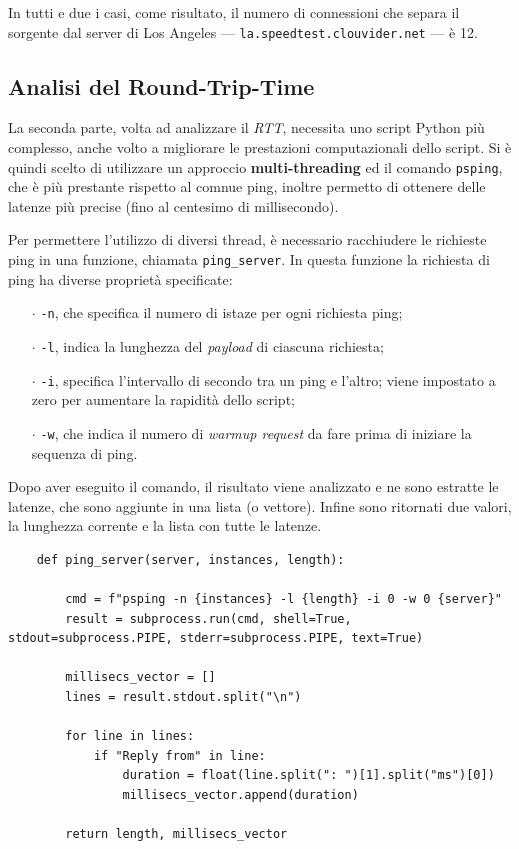\noindent In tutti e due i casi, come risultato, il numero di connessioni che separa il sorgente dal server di Los Angeles — \texttt{la.speedtest.clouvider.net} — è 12.


\vspace{20px}\subsection{Analisi del Round-Trip-Time}\label{RTT}

La seconda parte, volta ad analizzare il \textsl{RTT}, necessita uno script Python più complesso, anche volto a migliorare le prestazioni computazionali dello script. Si è quindi scelto di utilizzare un approccio \textbf{multi-threading} ed il comando \texttt{psping}, che è più prestante rispetto al comnue ping, inoltre permetto di ottenere delle latenze più precise (fino al centesimo di millisecondo).

Per permettere l'utilizzo di diversi thread, è necessario racchiudere le richieste ping in una funzione, chiamata \texttt{ping\_server}. In questa funzione la richiesta di ping ha diverse proprietà specificate:
\vspace{-3px}
\begin{itemize}
    \setlength{\itemsep}{-2px}
    \item[$\cdot$] \texttt{-n}, che specifica il numero di istaze per ogni richiesta ping;
    \item[$\cdot$] \texttt{-l}, indica la lunghezza del \textsl{payload} di ciascuna richiesta;
    \item[$\cdot$] \texttt{-i}, specifica l'intervallo di secondo tra un ping e l'altro; viene impostato a zero per aumentare la rapidità dello script;
    \item[$\cdot$] \texttt{-w}, che indica il numero di \textsl{warmup request} da fare prima di iniziare la sequenza di ping.
\end{itemize}
\noindent Dopo aver eseguito il comando, il risultato viene analizzato e ne sono estratte le latenze, che sono aggiunte in una lista (o vettore). Infine sono ritornati due valori, la lunghezza corrente e la lista con tutte le latenze.

\begin{lstlisting}
    def ping_server(server, instances, length):

        cmd = f"psping -n {instances} -l {length} -i 0 -w 0 {server}"
        result = subprocess.run(cmd, shell=True, stdout=subprocess.PIPE, stderr=subprocess.PIPE, text=True)

        millisecs_vector = []
        lines = result.stdout.split("\n")
        
        for line in lines:
            if "Reply from" in line:
                duration = float(line.split(": ")[1].split("ms")[0])
                millisecs_vector.append(duration)
        
        return length, millisecs_vector
\end{lstlisting}


